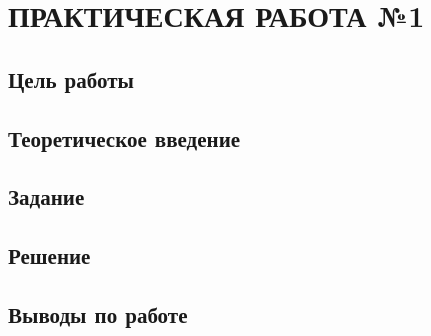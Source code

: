 \documentclass[java]{mirea}
\author  {Фамилия И.О.}
\begin{document}
	\chapter{ПРАКТИЧЕСКАЯ РАБОТА №1}
	\section{Цель работы}
	\section{Теоретическое введение}
	\section{Задание}
	\section{Решение}
	\section{Выводы по работе}
\end{document}
